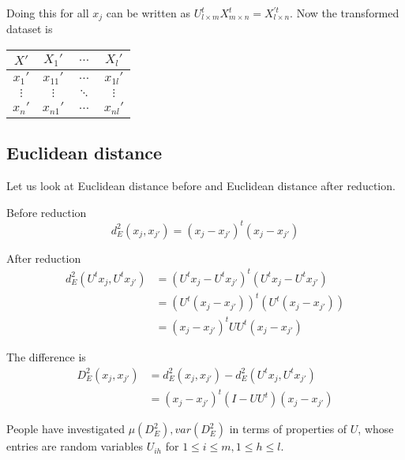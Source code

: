 \documentclass[11pt]{amsart}
\theoremstyle{definition}
\begin{document}
Doing this for all $x_j$ can be written as $U^t_{l \times m} X^t_{m \times n} = X^{'t}_{l \times n}$. Now the transformed dataset is
\vspace{10pt}
\begin{center}
\begin{tabular}{c | c c c}
$X'$ & $X_1'$ & $\dots$ & $X_l'$ \\
\hline
$x_1'$ & $x_{11}'$ & $\dots$ & $x_{1l}'$ \\
$\vdots$ & $\vdots$ & $\ddots$ & $\vdots$ \\
$x_n'$ & $x_{n1}'$ & $\dots$ & $x_{nl}'$ \\
\end{tabular}
\end{center}
\vspace{10pt}

\subsection{Euclidean distance} \label{Euclideandistance} Let us look at Euclidean distance before and Euclidean distance after reduction.

Before reduction
$$d_E^2 (x_j, x_{j'}) = (x_j - x_{j'})^t (x_j - x_{j'})$$

After reduction
\begin{align*}
d_E^2 (U^t x_j, U^t x_{j'}) & = (U^t x_j - U^t x_{j'})^t (U^t x_j - U^t x_{j'}) \\
 & = (U^t (x_j - x_{j'}))^t (U^t (x_j - x_{j'})) \\
 & = (x_j - x_{j'})^t UU^t (x_j - x_{j'})
\end{align*}

The difference is
\begin{align*}
D_E^2 (x_j, x_{j'}) & = d_E^2 (x_j, x_{j'}) - d_E^2 (U^t x_j, U^t x_{j'}) \\
 & = (x_j - x_{j'})^t (I - UU^t)(x_j - x_{j'})
\end{align*}

People have investigated $\mu(D_E^2), var(D_E^2)$ in terms of properties of $U$, whose entries are random variables $U_{ih}$ for $1 \leq i \leq m, 1 \leq h \leq l$.
\end{document}
